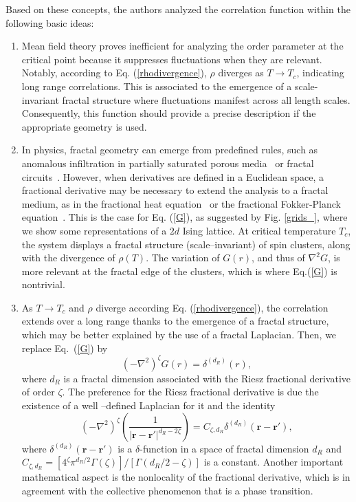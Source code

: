 \documentclass[pre,aps,twocolumn,showpacs,floatfix,nofootinbib,superscriptaddress,linenumbers]{revtex4-1}
\renewcommand{\vec}{\mathbf}
\newcommand{\tr}{ }
\begin{document}
Based on these concepts, the authors analyzed the correlation function within the following basic ideas:
\begin{enumerate}

\item  Mean field theory proves inefficient for analyzing the order parameter at the critical point because it suppresses fluctuations when they are relevant. Notably, according to Eq. (\ref{rhodivergence}), $\rho$ diverges as $T \rightarrow T_c$, indicating long range correlations. This is associated to the emergence of a scale-invariant fractal structure where fluctuations manifest across all length scales. Consequently, this function should provide a precise description if the appropriate geometry is used.

 \item In physics, fractal geometry can emerge from predefined rules, such as anomalous infiltration in partially saturated porous media~\cite{Voller25} or fractal circuits~\cite{Chen17,Boyle07,Anjos24}.  However, when derivatives are defined in a Euclidean space, a fractional derivative may be necessary to extend the analysis to a fractal medium, as in the fractional heat equation~\cite{Angulo00} or the fractional Fokker-Planck equation~\cite{Metzler99,Barkai01,Sokolov01}. This is the case for Eq. (\ref{G}), as suggested by Fig. \ref{grids_}, where we show some representations of a $2d$ Ising lattice. At critical temperature $T_{c}$, the system displays a fractal structure (scale--invariant) of spin clusters, along with the divergence of $\rho(T)$. The variation of $G(r)$, and thus of $\nabla^2 G$, is more relevant at the fractal edge of the clusters, which is where Eq.(\ref{G}) is nontrivial.

\item As $T \rightarrow T_c$ and $\rho$ diverge according Eq. (\ref{rhodivergence}), the correlation extends over a long range thanks to the emergence of a fractal structure, which may be better explained by the use of a fractal Laplacian.  Then, we replace Eq.\ (\ref{G}) by 
\begin{equation}
\label{G3}
(-\nabla^2)^\zeta G(r)=\delta^{(d_R)}(r),
\end{equation}
where $d_R$ is a fractal dimension associated with the Riesz fractional derivative of order $\zeta$. The preference for the Riesz fractional derivative is \tr{due} the existence of a well\tr{--}defined Laplacian for it and the identity ~\cite{Muslih10,Muslih10b}
\begin{equation}
\label{SG3}
(-\nabla^2)^\zeta \left(\frac{1}{|\vec{r}-\vec{r'}|^{d_R-2\zeta}} \right) = C_{\zeta,d_R}  \delta^{(d_R)}(\vec{r}-\vec{r'}),
\end{equation}
where  $\delta^{(d_R)}(\vec{r}-\vec{r'})$ is a $\delta$-function in a space of fractal dimension $d_R$ and $C_{\zeta,d_R}=[4^{\zeta} \pi^{d_R/2} \Gamma(\zeta)]/[ \Gamma(d_R/2-\zeta)]$ is a constant. Another important mathematical aspect is the nonlocality of the fractional derivative, which is in agreement with the  collective phenomenon that is a phase transition.


\end{enumerate}
\end{document}
